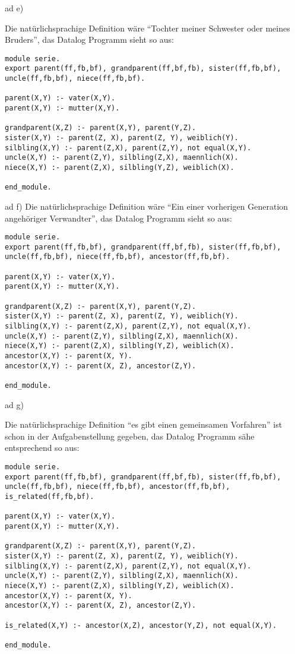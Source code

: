 \documentclass[12pt,a4paper]{amsart}
\begin{document}
\medskip

ad e)

Die natürlichsprachige Definition wäre ``Tochter meiner Schwester oder meines Bruders'', das Datalog Programm sieht so aus:

\begin{lstlisting}
module serie.
export parent(ff,fb,bf), grandparent(ff,bf,fb), sister(ff,fb,bf), uncle(ff,fb,bf), niece(ff,fb,bf).

parent(X,Y) :- vater(X,Y).
parent(X,Y) :- mutter(X,Y).

grandparent(X,Z) :- parent(X,Y), parent(Y,Z).
sister(X,Y) :- parent(Z, X), parent(Z, Y), weiblich(Y).
silbling(X,Y) :- parent(Z,X), parent(Z,Y), not equal(X,Y).
uncle(X,Y) :- parent(Z,Y), silbling(Z,X), maennlich(X).
niece(X,Y) :- parent(Z,X), silbling(Y,Z), weiblich(X).

end_module.
\end{lstlisting}

\medskip

ad f)
Die natürlichsprachige Definition wäre ``Ein einer vorherigen Generation angehöriger Verwandter'', das Datalog Programm sieht so aus:

\begin{lstlisting}
module serie.
export parent(ff,fb,bf), grandparent(ff,bf,fb), sister(ff,fb,bf), uncle(ff,fb,bf), niece(ff,fb,bf), ancestor(ff,fb,bf).

parent(X,Y) :- vater(X,Y).
parent(X,Y) :- mutter(X,Y).

grandparent(X,Z) :- parent(X,Y), parent(Y,Z).
sister(X,Y) :- parent(Z, X), parent(Z, Y), weiblich(Y).
silbling(X,Y) :- parent(Z,X), parent(Z,Y), not equal(X,Y).
uncle(X,Y) :- parent(Z,Y), silbling(Z,X), maennlich(X).
niece(X,Y) :- parent(Z,X), silbling(Y,Z), weiblich(X).
ancestor(X,Y) :- parent(X, Y).
ancestor(X,Y) :- parent(X, Z), ancestor(Z,Y).

end_module.
\end{lstlisting}

\newpage

ad g)

Die natürlichsprachige Definition ``es gibt einen gemeinsamen Vorfahren'' ist schon in der Aufgabenstellung gegeben, das Datalog Programm sähe entsprechend so aus:

\begin{lstlisting}
module serie.
export parent(ff,fb,bf), grandparent(ff,bf,fb), sister(ff,fb,bf), uncle(ff,fb,bf), niece(ff,fb,bf), ancestor(ff,fb,bf), is_related(ff,fb,bf).

parent(X,Y) :- vater(X,Y).
parent(X,Y) :- mutter(X,Y).

grandparent(X,Z) :- parent(X,Y), parent(Y,Z).
sister(X,Y) :- parent(Z, X), parent(Z, Y), weiblich(Y).
silbling(X,Y) :- parent(Z,X), parent(Z,Y), not equal(X,Y).
uncle(X,Y) :- parent(Z,Y), silbling(Z,X), maennlich(X).
niece(X,Y) :- parent(Z,X), silbling(Y,Z), weiblich(X).
ancestor(X,Y) :- parent(X, Y).
ancestor(X,Y) :- parent(X, Z), ancestor(Z,Y).

is_related(X,Y) :- ancestor(X,Z), ancestor(Y,Z), not equal(X,Y).

end_module.
\end{lstlisting}
\end{document}
